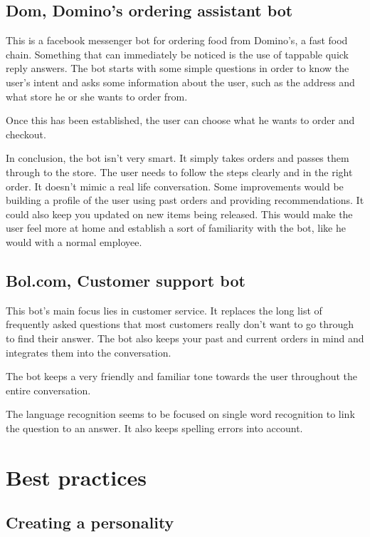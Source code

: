 \subsection{Dom, Domino's ordering assistant bot}

This is a facebook messenger bot for ordering food from Domino's, a fast food chain. Something that can immediately be noticed is the use of tappable quick reply answers. The bot starts with some simple questions in order to know the user's intent and asks some information about the user, such as the address and what store he or she wants to order from.

Once this has been established, the user can choose what he wants to order and checkout.

In conclusion, the bot isn't very smart. It simply takes orders and passes them through to the store. The user needs to follow the steps clearly and in the right order. It doesn't mimic a real life conversation. Some improvements would be building a profile of the user using past orders and providing recommendations. It could also keep you updated on new items being released. This would make the user feel more at home and establish a sort of familiarity with the bot, like he would with a normal employee.

\subsection{Bol.com, Customer support bot}

This bot's main focus lies in customer service. It replaces the long list of frequently asked questions that most customers really don't want to go through to find their answer. The bot also keeps your past and current orders in mind and integrates them into the conversation.

The bot keeps a very friendly and familiar tone towards the user throughout the entire conversation.

The language recognition seems to be focused on single word recognition to link the question to an answer. It also keeps spelling errors into account.

\section{Best practices}

\subsection{Creating a personality}

